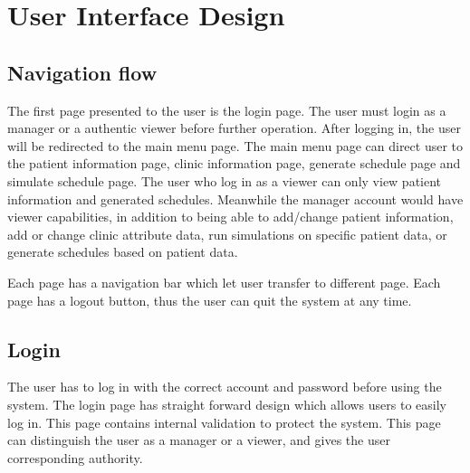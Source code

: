 \documentclass[12pt]{article}
\begin{document}
\section{User Interface Design}

\subsection{Navigation flow}
The first page presented to the user is the login page. The user must login as a manager or a authentic viewer before further operation. After logging in, the user will be redirected to the main menu page. The main menu page can direct user to the patient information page, clinic information page, generate schedule page and simulate schedule page. The user who log in as a viewer can only view patient information and generated schedules. Meanwhile the manager account would have viewer capabilities, in addition to being able to add/change patient information, add or change clinic attribute data, run simulations on specific patient data, or generate schedules based on patient data.

\noindent \newline
Each page has a navigation bar which let user transfer to different page. Each page has a logout button, thus the user can quit the system at any time. 

\begin{figure}[!h]
\centering
\end{figure}

\subsection{Login}
The user has to log in with the correct account and password before using the system. The login page has straight forward design which allows users to easily log in. This page contains internal validation to protect the system. This page can distinguish the user as a manager or a viewer, and gives the user corresponding authority. 
\end{document}
